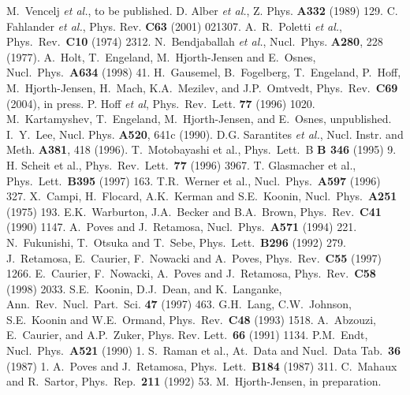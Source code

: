 \documentclass{article}
\begin{document}
\begin{thebibliography}{200}
M.~Vencelj {\it et al.}, to be published.
 D. Alber {\it et al.}, Z. Phys. {\bf A332} (1989) 129.
 C. Fahlander {\it et al.}, Phys. Rev. {\bf C63} (2001) 021307.
 A.~R.~Poletti {\it et al.},
Phys.~Rev.~{\bf C10}  (1974) 2312.
 N.~Bendjaballah {\it et al.},
Nucl.~Phys. {\bf A280}, 228 (1977).
 A.\ Holt, T.\ Engeland, M.\ Hjorth-Jensen and E.\ Osnes,
Nucl.\ Phys.\ {\bf A634} (1998) 41.
H.~Gausemel, B.~Fogelberg, T.~Engeland, P.~Hoff, M.~Hjorth-Jensen, 
H.~Mach, K.A.~Mezilev, and J.P.~Omtvedt, Phys.~Rev.~{\bf C69} (2004), in press.
  P. Hoff {\em et al}, Phys.~Rev.~Lett. {\bf 77} (1996) 1020.  
 M.~Kartamyshev, T.~Engeland, M.~Hjorth-Jensen, and E.~Osnes,
unpublished. 
 I.~Y.~Lee, Nucl. Phys. {\bf A520}, 641c (1990).
 D.G. Sarantites {\it et al.}, Nucl. Instr. and Meth.
{\bf A381}, 418 (1996).
 T.\ Motobayashi et al.,
Phys.\ Lett.\ B {\bf B 346} (1995) 9.
 H. Scheit et al., Phys.\ Rev.\ Lett.\ {\bf 77} (1996) 3967.
 T. Glasmacher et al.,  Phys.\ Lett.\ {\bf B395} (1997) 163.
 T.R.\ Werner et al., Nucl.\ Phys.\ {\bf A597} (1996) 327.
 X.\ Campi, H.\ Flocard, A.K.\ Kerman and S.E.\ Koonin,
Nucl.\ Phys.\ {\bf A251} (1975) 193.
 E.K.\ Warburton, J.A.\ Becker and B.A.\ Brown, Phys.\
 Rev.\ {\bf C41} (1990) 1147.
 A.\ Poves and J.\ Retamosa, Nucl.\ Phys.\ {\bf A571}
(1994) 221.
 N.\ Fukunishi, T.\ Otsuka and T.\ Sebe,
Phys.\ Lett.\ {\bf B296} (1992) 279.
 J.\ Retamosa, E.\ Caurier, F.\ Nowacki and A.\ Poves,
Phys.\ Rev.\ {\bf C55} (1997) 1266.
 E.\ Caurier, F.\ Nowacki, A.\ Poves and J.\ Retamosa,
Phys.\ Rev.\  {\bf C58} (1998) 2033.
 S.E.\ Koonin, D.J.\ Dean, and K.\ Langanke,
Ann.\ Rev.\ Nucl.\ Part.\ Sci. {\bf 47} (1997) 463.
 G.H.\ Lang, C.W.\ Johnson, S.E.\ Koonin and W.E.\ Ormand,
Phys.\ Rev.\ {\bf C48} (1993) 1518.
 A.\ Abzouzi, E.\ Caurier, and A.P.\ Zuker, Phys.  Rev.
  Lett.\  {\bf 66} (1991) 1134.
 P.M.\ Endt, Nucl.\ Phys.\ {\bf A521} (1990) 1.
\bibitem{r:raman} S.\ Raman et al., At.\ Data and Nucl.\ Data Tab.\
{\bf 36} (1987) 1.
\bibitem{r:poves2} A.\ Poves and J.\ Retamosa, Phys.\ Lett.\ 
{\bf B184} (1987) 311.
\bibitem{ms92} C.\ Mahaux and R.\ Sartor, Phys.\ Rep.\
{\bf 211} (1992) 53. 
\bibitem{mhj99} M.\ Hjorth-Jensen, in preparation.

\end{thebibliography}
\end{document}
